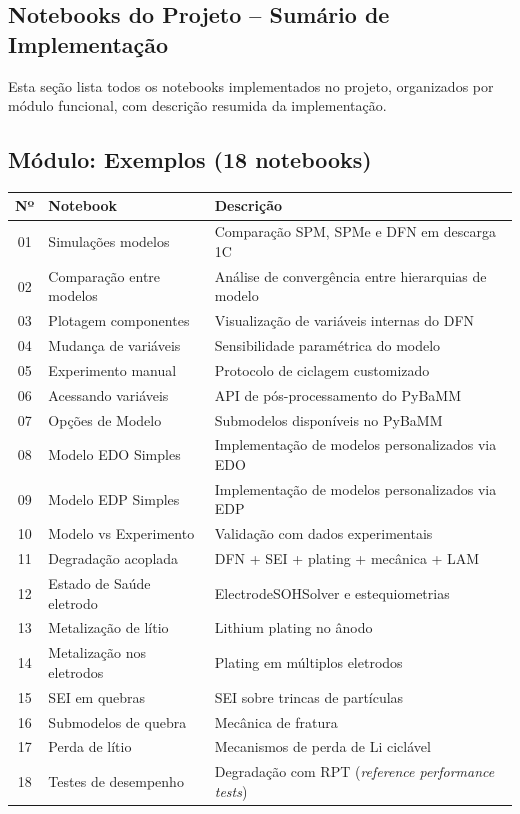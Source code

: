 \documentclass[
    12pt,
    openright,
    twoside,
    a4paper,
    brazil,
    english
]{abntex2}
\begin{document}
\begin{apendicesenv}

\partapendices

\chapter{Notebooks do Projeto -- Sumário de Implementação}
\label{apend:notebooks}

Esta seção lista todos os notebooks implementados no projeto, organizados por
módulo funcional, com descrição resumida da implementação.

\section{Módulo: Exemplos (18 notebooks)}

\begin{longtable}{clp{8cm}}
  \toprule
  \textbf{Nº} & \textbf{Notebook} & \textbf{Descrição} \\
  \midrule
  01 & Simulações modelos         & Comparação SPM, SPMe e DFN em descarga 1C \\
  02 & Comparação entre modelos   & Análise de convergência entre hierarquias de modelo \\
  03 & Plotagem componentes       & Visualização de variáveis internas do DFN \\
  04 & Mudança de variáveis       & Sensibilidade paramétrica do modelo \\
  05 & Experimento manual         & Protocolo de ciclagem customizado \\
  06 & Acessando variáveis        & API de pós-processamento do PyBaMM \\
  07 & Opções de Modelo           & Submodelos disponíveis no PyBaMM \\
  08 & Modelo EDO Simples         & Implementação de modelos personalizados via EDO \\
  09 & Modelo EDP Simples         & Implementação de modelos personalizados via EDP \\
  10 & Modelo vs Experimento      & Validação com dados experimentais \\
  11 & Degradação acoplada        & DFN + SEI + plating + mecânica + LAM \\
  12 & Estado de Saúde eletrodo   & ElectrodeSOHSolver e estequiometrias \\
  13 & Metalização de lítio       & Lithium plating no ânodo \\
  14 & Metalização nos eletrodos  & Plating em múltiplos eletrodos \\
  15 & SEI em quebras             & SEI sobre trincas de partículas \\
  16 & Submodelos de quebra       & Mecânica de fratura \\
  17 & Perda de lítio             & Mecanismos de perda de Li ciclável \\
  18 & Testes de desempenho       & Degradação com RPT (\textit{reference performance tests}) \\
  \bottomrule
\end{longtable}


\end{apendicesenv}
\end{document}
